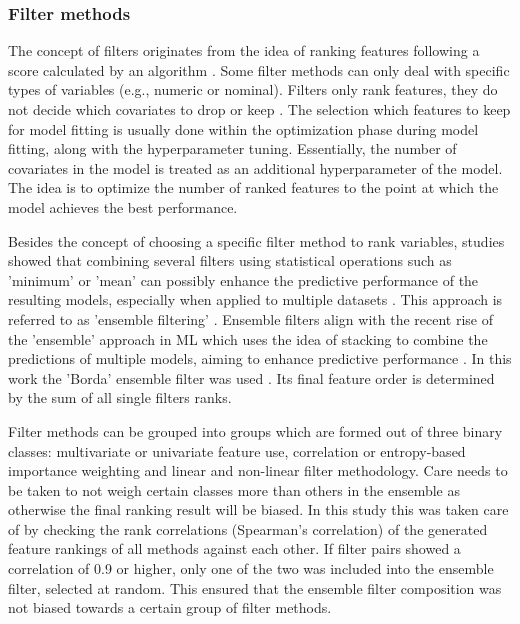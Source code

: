 \documentclass[remotesensing,article,submit,moreauthors,pdftex]{Definitions/mdpi}
\begin{document}
\subsubsection{Filter methods}

The concept of filters originates from the idea of ranking features following a score calculated by an algorithm \cite{guyon2003}.
Some filter methods can only deal with specific types of variables (e.g., numeric or nominal).
Filters only rank features, they do not decide which covariates to drop or keep \cite{drotar2015}.
The selection which features to keep for model fitting is usually done within the optimization phase during model fitting, along with the hyperparameter tuning.
Essentially, the number of covariates in the model is treated as an additional hyperparameter of the model.
The idea is to optimize the number of ranked features to the point at which the model achieves the best performance.

Besides the concept of choosing a specific filter method to rank variables, studies showed that combining several filters using statistical operations such as 'minimum' or 'mean' can possibly enhance the predictive performance of the resulting models, especially when applied to multiple datasets \cite{abeel2010, drotar2017}.
This approach is referred to as 'ensemble filtering' \cite{dietterich2000}.
Ensemble filters align with the recent rise of the 'ensemble' approach in ML which uses the idea of stacking to combine the predictions of multiple models, aiming to enhance predictive performance \cite{polikar2012, feurer2015, bolon-canedo2019}.
In this work the 'Borda' ensemble filter was used \cite{drotar2017}.
Its final feature order is determined by the sum of all single filters ranks.

Filter methods can be grouped into groups which are formed out of three binary classes: multivariate or univariate feature use, correlation or entropy-based importance weighting and linear and non-linear filter methodology.
Care needs to be taken to not weigh certain classes more than others in the ensemble as otherwise the final ranking result will be biased.
In this study this was taken care of by checking the rank correlations (Spearman's correlation) of the generated feature rankings of all methods against each other.
If filter pairs showed a correlation of 0.9 or higher, only one of the two was included into the ensemble filter, selected at random.
This ensured that the ensemble filter composition was not biased towards a certain group of filter methods.
\end{document}
